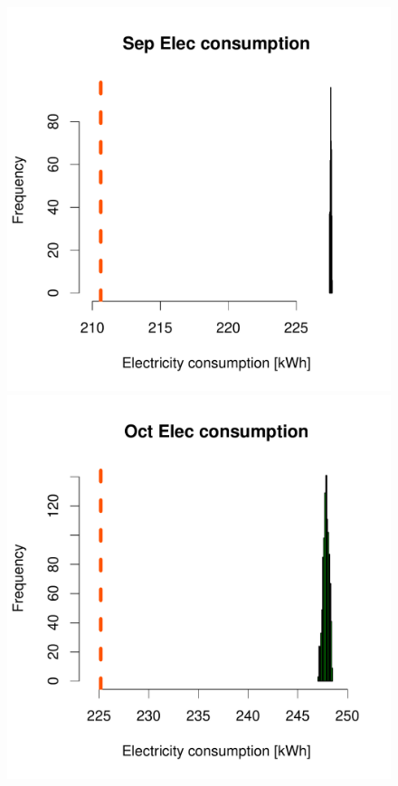 \documentclass[a4paper, 12pt]{article}
\begin{document}
\begin{figure}
 \includegraphics[width=\scale]{Simulation_histograms/Batch_2_Only/Elec_Runs/Sep_Elec}\\
 \includegraphics[width=\scale]{Simulation_histograms/Batch_2_Only/Elec_Runs/Oct_Elec}

\end{figure}
\end{document}
